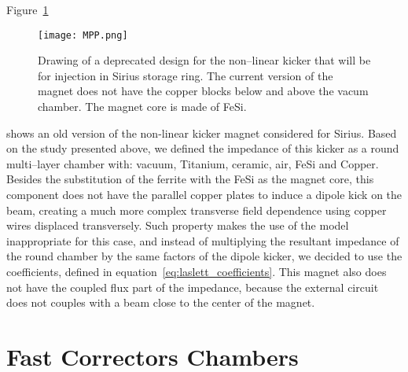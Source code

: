     Figure~\ref{fig:non_linear_kicker}
    \begin{figure}
        \centering
        \texttt{[image: MPP.png]}
        \caption[Drawing of non--linear kicker magnet.]{Drawing of a deprecated design for the non--linear kicker that will be for injection in Sirius storage ring. The current version of the magnet does not have the copper blocks below and above the vacum chamber. The magnet core is made of FeSi.}
        \label{fig:non_linear_kicker}
    \end{figure}
    shows an old version of the non-linear kicker magnet considered for Sirius. Based on the study presented above, we defined the impedance of this kicker as a round multi--layer chamber with: vacuum, Titanium, ceramic, air, FeSi and Copper. Besides the substitution of the ferrite with the FeSi as the magnet core, this component does not have the parallel copper plates to induce a dipole kick on the beam, creating a much more complex transverse field dependence using copper wires displaced transversely.  Such property makes the use of the  model inappropriate for this case, and instead of multiplying the resultant impedance of the round chamber by the same factors of the dipole kicker, we decided to use the  coefficients, defined in equation~\eqref{eq:laslett_coefficients}. This magnet also does not have the coupled flux part of the impedance, because the external circuit does not couples with a beam close to the center of the magnet.

\section{Fast Correctors Chambers}

